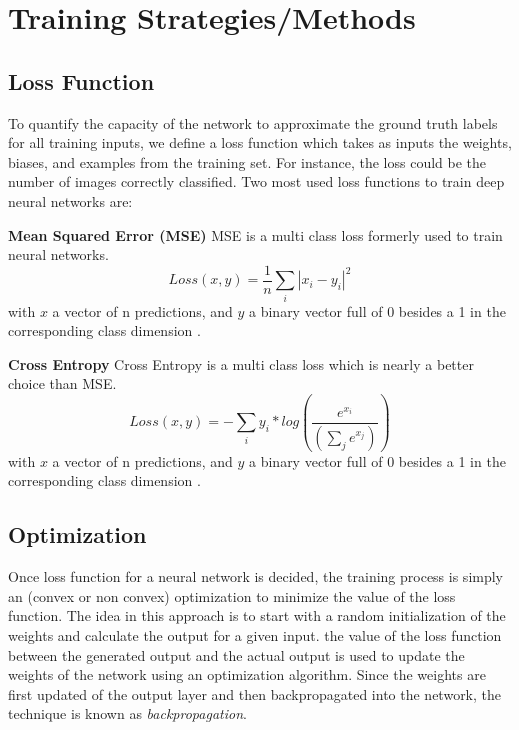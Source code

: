 \section{Training Strategies/Methods}
    \subsection{Loss Function}
    To quantify the capacity of the network to approximate the ground truth
    labels for all training inputs, we define a loss function which takes as inputs the weights,
    biases, and examples from the training set. For instance, the loss could be the number
    of images correctly classified. Two most used loss functions to train deep neural networks are:
    
    \vspace{5mm}
    \par \noindent
    \textbf{Mean Squared Error (MSE)} MSE is a multi class loss formerly used to train neural
    networks.
    \begin{equation}
        Loss(x,y)= \frac{1}{n}\sum_i{|x_i-y_i|}^2
    \end{equation}
    with $x$ a vector of n predictions, and $y$ a binary vector full of 0 besides a 1 in the corresponding class dimension .
    
    \vspace{5mm}
    \par \noindent
    \textbf{Cross Entropy} Cross Entropy is a multi class loss which is nearly a better choice than MSE.
    \begin{equation}
        Loss(x,y)= -\sum_i y_i * log(\frac{e^{x_i}}{(\sum_j e^{x_j})})
    \end{equation}
    with $x$ a vector of n predictions, and $y$ a binary vector full of 0 besides a 1 in the corresponding class dimension .
   
    \subsection{Optimization}\label{sec:342}
    Once loss function for a neural network is decided, the training process is simply an (convex or non convex) optimization to minimize the value of the loss function. The idea in this approach is to start with a random initialization of the weights and calculate the output for a given input. the value of the loss function between the generated output and the actual output is used to update the weights of the network using an optimization algorithm. Since the weights are first updated of the output layer and then backpropagated into the network, the technique is known as \textit{backpropagation}.
    
